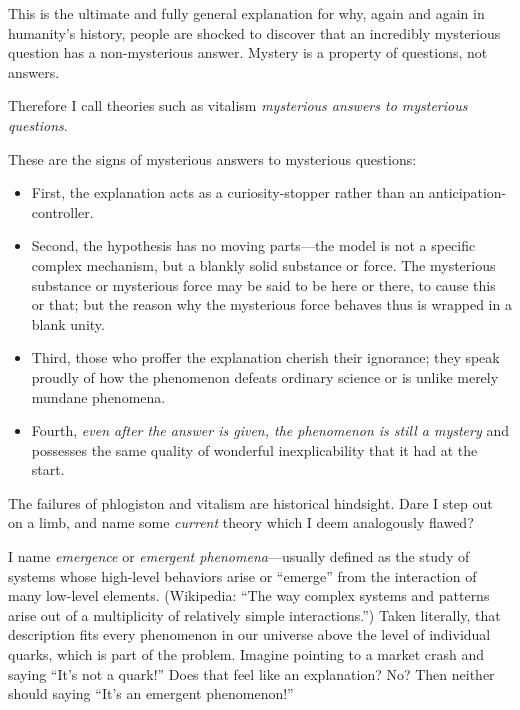 {
 This is the ultimate and fully general explanation for why, again
and again in humanity's history, people are shocked to
discover that an incredibly mysterious question has a non-mysterious
answer. Mystery is a property of questions, not answers.}

{
 Therefore I call theories such as vitalism \textit{mysterious
answers to mysterious questions}.}

{
 These are the signs of mysterious answers to mysterious
questions:}

\begin{itemize}
\item {
 First, the explanation acts as a curiosity-stopper rather than an
anticipation-controller.}

\item {
 Second, the hypothesis has no moving parts---the model is not a
specific complex mechanism, but a blankly solid substance or force. The
mysterious substance or mysterious force may be said to be here or
there, to cause this or that; but the reason why the mysterious force
behaves thus is wrapped in a blank unity.}

\item {
 Third, those who proffer the explanation cherish their ignorance;
they speak proudly of how the phenomenon defeats ordinary science or is
unlike merely mundane phenomena.}

\item {
 Fourth, \textit{even after the answer is given, the phenomenon is
still a mystery} and possesses the same quality of wonderful
 inexplicability that it had at the start.}

\end{itemize}

\myendsectiontext


\bigskip


{
 The failures of phlogiston and vitalism are historical hindsight.
Dare I step out on a limb, and name some \textit{current} theory which
I deem analogously flawed? }

{
 I name \textit{emergence} or \textit{emergent
phenomena}{}---usually defined as the study of systems whose high-level
behaviors arise or ``emerge'' from
the interaction of many low-level elements. (Wikipedia:
``The way complex systems and patterns arise out of a
multiplicity of relatively simple interactions.'')
Taken literally, that description fits every phenomenon in our universe
above the level of individual quarks, which is part of the problem.
Imagine pointing to a market crash and saying
``It's not a
quark!'' Does that feel like an explanation? No? Then
neither should saying ``It's an
emergent phenomenon!''}

